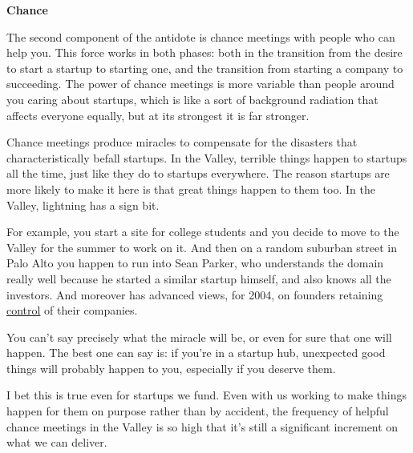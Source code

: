 \textbf{Chance}

The second component of the antidote is chance
                    meetings with people who can help you. This force works in
                    both phases: both in the transition from the desire to start
                    a startup to starting one, and the transition from starting
                    a company to succeeding. The power of chance meetings is
                    more variable than people around you caring about startups,
                    which is like a sort of background radiation that affects
                    everyone equally, but at its strongest it is far
                    stronger.

Chance meetings produce miracles to
                    compensate for the disasters that characteristically befall
                    startups. In the Valley, terrible things happen to startups
                    all the time, just like they do to startups everywhere. The
                    reason startups are more likely to make it here is that
                    great things happen to them too. In the Valley, lightning
                    has a sign bit.

For example, you start a site for
                    college students and you decide to move to the Valley for
                    the summer to work on it. And then on a random suburban
                    street in Palo Alto you happen to run into Sean Parker, who
                    understands the domain really well because he started a
                    similar startup himself, and also knows all the investors.
                    And moreover has advanced views, for 2004, on founders
                    retaining \href{http://www.paulgraham.com/control.html}{control} of their
                    companies.

You can't say precisely what the
                    miracle will be, or even for sure that one will happen. The
                    best one can say is: if you're in a startup hub, unexpected
                    good things will probably happen to you, especially if you
                    deserve them.

I bet this is true even for
                    startups we fund. Even with us working to make things happen
                    for them on purpose rather than by accident, the frequency
                    of helpful chance meetings in the Valley is so high that
                    it's still a significant increment on what we can
                    deliver.

